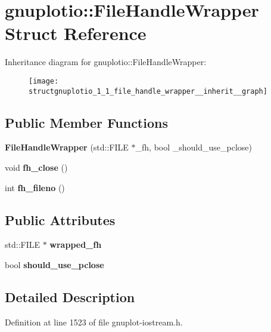 \hypertarget{structgnuplotio_1_1_file_handle_wrapper}{}\section{gnuplotio\+:\+:File\+Handle\+Wrapper Struct Reference}
\label{structgnuplotio_1_1_file_handle_wrapper}


Inheritance diagram for gnuplotio\+:\+:File\+Handle\+Wrapper\+:
\nopagebreak
\begin{figure}[H]
\begin{center}
\leavevmode
\texttt{[image: structgnuplotio\_1\_1\_file\_handle\_wrapper\_\_inherit\_\_graph]}
\end{center}
\end{figure}
\subsection*{Public Member Functions}
\begin{DoxyCompactItemize}
\item 
{\bfseries File\+Handle\+Wrapper} (std\+::\+F\+I\+LE $\ast$\+\_\+fh, bool \+\_\+should\+\_\+use\+\_\+pclose)\hypertarget{structgnuplotio_1_1_file_handle_wrapper_a26b2378e193a9c41be5aed97e11f9411}{}\label{structgnuplotio_1_1_file_handle_wrapper_a26b2378e193a9c41be5aed97e11f9411}

\item 
void {\bfseries fh\+\_\+close} ()\hypertarget{structgnuplotio_1_1_file_handle_wrapper_acafac45efd9c78ce621af4f3228c6f67}{}\label{structgnuplotio_1_1_file_handle_wrapper_acafac45efd9c78ce621af4f3228c6f67}

\item 
int {\bfseries fh\+\_\+fileno} ()\hypertarget{structgnuplotio_1_1_file_handle_wrapper_a3202ccd15d624f26dd2cf699d3456de6}{}\label{structgnuplotio_1_1_file_handle_wrapper_a3202ccd15d624f26dd2cf699d3456de6}

\end{DoxyCompactItemize}
\subsection*{Public Attributes}
\begin{DoxyCompactItemize}
\item 
std\+::\+F\+I\+LE $\ast$ {\bfseries wrapped\+\_\+fh}\hypertarget{structgnuplotio_1_1_file_handle_wrapper_adcb58bfcd9dbdba000a7e7395bee2ef9}{}\label{structgnuplotio_1_1_file_handle_wrapper_adcb58bfcd9dbdba000a7e7395bee2ef9}

\item 
bool {\bfseries should\+\_\+use\+\_\+pclose}\hypertarget{structgnuplotio_1_1_file_handle_wrapper_a11b63ed64cf53167e26c5273778d90ea}{}\label{structgnuplotio_1_1_file_handle_wrapper_a11b63ed64cf53167e26c5273778d90ea}

\end{DoxyCompactItemize}


\subsection{Detailed Description}


Definition at line 1523 of file gnuplot-\/iostream.\+h.

